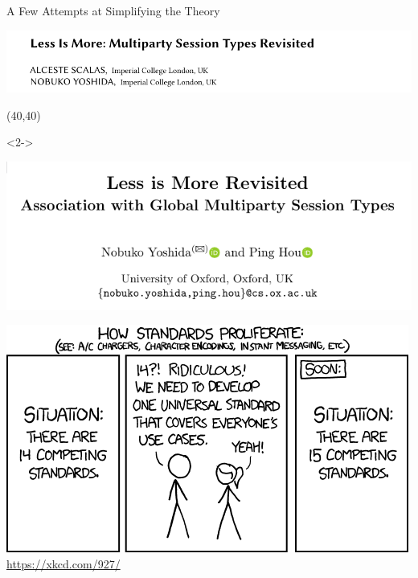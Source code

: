 \begin{frame}{A Few Attempts at Simplifying the Theory}

    \begin{minipage}{.86\columnwidth}
    \begin{sticky}
  \includegraphics[width=\textwidth]{figures/less-is-more.pdf}
    \end{sticky}
    \end{minipage}

  \Put(40,40){%
    \begin{onlyenv}<2->
    \begin{minipage}{.86\columnwidth}
    \begin{sticky}
  \includegraphics[width=\textwidth]{figures/less-is-more-revisite.pdf}
    \end{sticky}
    \end{minipage}
    \end{onlyenv}
   }

\end{frame}

\begin{frame}
  \includegraphics[width=\columnwidth]{figures/xkcd-standards.png}
  \href{https://xkcd.com/927/}{https://xkcd.com/927/}
\end{frame}


